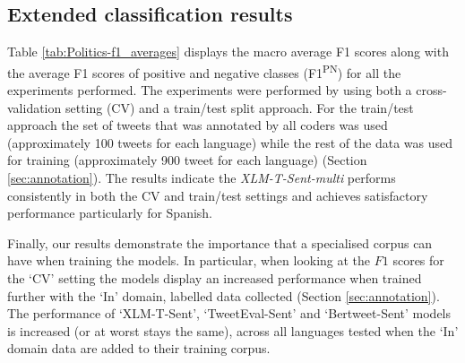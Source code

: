 \subsection{Extended classification results}
Table \ref{tab:Politics-f1_averages} displays the macro average F1 scores along with the average F1 scores of positive and negative classes (F1\textsuperscript{PN}) for all the experiments performed. The experiments were performed by using both a cross-validation setting (CV) and a train/test split approach. For the train/test approach the set of tweets that was annotated by all coders was used (approximately 100 tweets for each language) while the rest of the data was used for training (approximately 900 tweet for each language) (Section \ref{sec:annotation}). The results indicate the \textit{XLM-T-Sent-multi} performs consistently in both the CV and train/test settings and achieves satisfactory performance particularly for Spanish. 

Finally, our results demonstrate the importance that a specialised corpus can have when training the models. In particular, when looking at the $F1$ scores for the `CV' setting the models display an increased performance when trained further with the `In' domain, labelled data collected (Section \ref{sec:annotation}). The performance of `XLM-T-Sent', `TweetEval-Sent' and `Bertweet-Sent' models is increased (or at worst stays the same), across all languages tested when the `In' domain data are added to their training corpus. 

